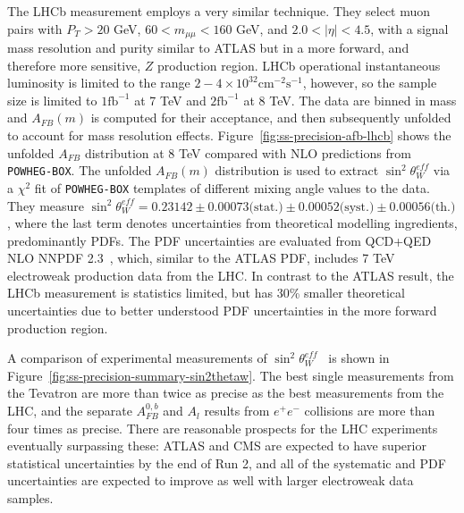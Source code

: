 The LHCb measurement employs a very similar technique.  They select
muon pairs with $P_T > 20$ GeV, $60 < m_{\mu\mu} < 160$ GeV, and $2.0 <
|\eta| < 4.5$, with a signal mass resolution and purity similar to
ATLAS but in a more forward, and therefore more sensitive, $Z$
production region.  LHCb operational instantaneous luminosity is
limited to the range $2-4\times
10^{32}\textrm{cm}^{-2}\textrm{s}^{-1}$, however, so the sample size
is limited to $1 \textrm{fb}^{-1}$ at 7 TeV and $2 \textrm{fb}^{-1}$
at 8 TeV.  The data are binned in mass and $A_{FB}(m)$ is computed for
their acceptance, and then subsequently unfolded to account for mass
resolution effects. Figure~\ref{fig:ss-precision-afb-lhcb} shows the
unfolded $A_{FB}$ distribution at 8 TeV compared with NLO predictions
from \texttt{POWHEG-BOX}.  The unfolded $A_{FB}(m)$ distribution is
used to extract $\sin^2\theta^{eff}_{W}$ via a $\chi^2$ fit
of \texttt{POWHEG-BOX} templates of different mixing angle values to
the data.  They measure $\sin^2\theta^{eff}_{W} = 0.23142 \pm
0.00073 \textrm{(stat.)} \pm 0.00052 \textrm{(syst.)} \pm
0.00056 \textrm{(th.)}$, where the last term denotes uncertainties
from theoretical modelling ingredients, predominantly PDFs.  The PDF
uncertainties are evaluated from QCD+QED NLO NNPDF
2.3~\cite{Ball:2013hta,Ball:2012cx}, which, similar to the ATLAS PDF,
includes 7 TeV electroweak production data from the LHC.  In contrast
to the ATLAS result, the LHCb measurement is statistics limited, but
has 30\% smaller theoretical uncertainties due to better understood
PDF uncertainties in the more forward production region.

A comparison of experimental measurements of
$\sin^2\theta^{eff}_{W}$~\cite{Aaltonen:2016nuy} is shown in
Figure~\ref{fig:ss-precision-summary-sin2thetaw}.  The best single
measurements from the Tevatron are more than twice as precise as the
best measurements from the LHC, and the separate $A^{0,b}_{FB}$ and
$A_{l}$ results from $e^+e^-$ collisions are more than four times as
precise.  There are reasonable prospects for the LHC experiments
eventually surpassing these: ATLAS and CMS are expected to have
superior statistical uncertainties by the end of Run 2, and all of the
systematic and PDF uncertainties are expected to improve as well with
larger electroweak data samples.

